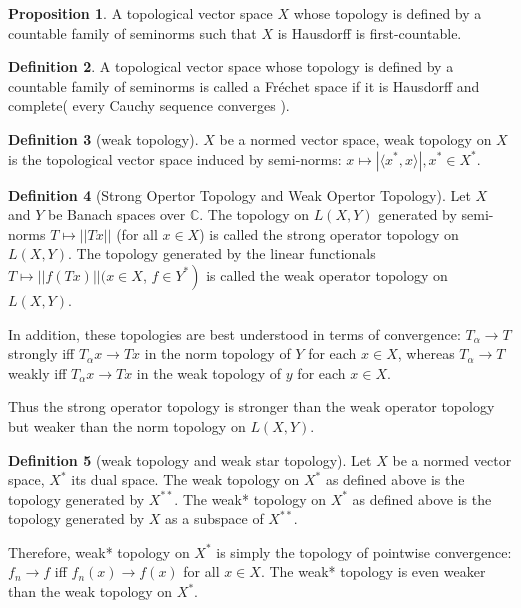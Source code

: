 \documentclass[12pt,a4paper]{book}
\newcommand{\inner}[2]{\langle {#1},{#2}\rangle}
\theoremstyle{definition}
\newtheorem{defn}{Definition}[section]
\newtheorem{prop}[defn]{Proposition}
\begin{document}
\begin{prop} 
    A topological vector space $X$ 
    whose topology is defined by a countable family of seminorms 
    such that $X$ is Hausdorff is first-countable. 
\end{prop}
\begin{defn}
    A topological vector space whose topology is defined by a countable family of seminorms is called a Fréchet space if it is Hausdorff and complete( every Cauchy sequence converges ).
\end{defn}
\begin{defn}[weak topology]
    $X$ be a normed vector space, weak topology on $X$ is the topological vector space induced by 
    semi-norms: $x\mapsto |\inner{x^*}{x}|,x^*\in X^*$.
\end{defn}
\begin{defn}[Strong Opertor Topology and Weak Opertor Topology]
    Let $X$ and $Y$ be Banach spaces over $\mathbb{C}$. 
    The topology on $L(X, Y)$ generated by semi-norms $T \mapsto ||T x||$ (for all $x \in X$) is called the strong operator topology on $L(X, Y)$. 
    The topology generated by the linear functionals $T \mapsto ||f(T x)|| (x \in X$, $\left.f \in Y^*\right)$ is called the weak operator topology on $L(X, Y)$. 
    
    In addition, these topologies are best understood in terms of convergence: $T_\alpha \rightarrow T$ strongly iff $T_\alpha x \rightarrow T x$ in the norm topology of $Y$ for each $x \in X$, whereas $T_\alpha \rightarrow T$ weakly iff $T_\alpha x \rightarrow T x$ in the weak topology of $y$ for each $x \in X$. 
    
    Thus the strong operator topology is stronger than the weak operator topology but weaker than the norm topology on $L(X, Y)$.  
\end{defn}
\begin{defn}[weak topology and weak star topology]
    Let $X$ be a normed vector space, $X^*$ its dual space. 
    The weak topology on $X^*$ as defined above is the topology generated by $X^{* *}$. 
    The weak* topology on $X^*$  as defined above is the topology generated by $X$ as a subspace of $X^{* *}$. 
    
    Therefore, weak* topology on $X^*$ is simply the topology of pointwise convergence: $f_n \rightarrow f$ iff $f_n(x) \rightarrow f(x)$ for all $x \in X$. The weak* topology is even weaker than the weak topology on $X^*$.

\end{defn}
\end{document}
